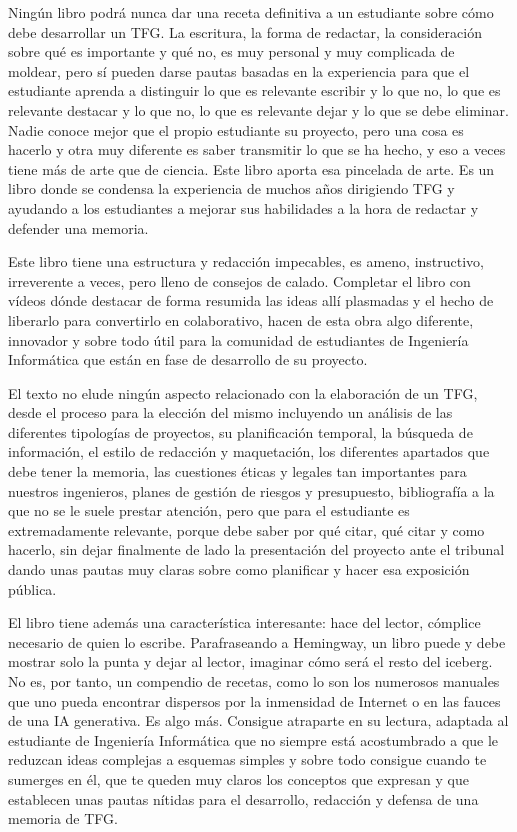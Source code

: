 Ningún libro podrá nunca dar una receta definitiva a un estudiante sobre cómo debe desarrollar un TFG. La escritura, la forma de redactar, la consideración sobre qué es importante y qué no, es muy personal y muy complicada de moldear, pero sí pueden darse pautas basadas en la experiencia para que el estudiante aprenda a distinguir lo que es relevante escribir y lo que no, lo que es relevante destacar y lo que no, lo que es relevante dejar y lo que se debe eliminar. Nadie conoce mejor que el propio estudiante su proyecto, pero una cosa es hacerlo y otra muy diferente es saber transmitir lo que se ha hecho, y eso a veces tiene más de arte que de ciencia.  Este libro aporta esa pincelada de arte. Es un libro donde se condensa la experiencia de muchos años dirigiendo TFG y ayudando a los estudiantes a mejorar sus habilidades a la hora de redactar  y defender una memoria.

Este libro tiene una estructura y redacción impecables, es ameno, instructivo, irreverente a veces, pero lleno de consejos de calado. Completar el libro con vídeos dónde destacar de forma resumida las ideas allí plasmadas y el hecho de liberarlo para convertirlo en colaborativo, hacen de esta obra algo diferente, innovador y sobre todo útil para la comunidad de estudiantes de Ingeniería Informática que están en fase de desarrollo de su proyecto.  

El texto no elude ningún aspecto relacionado con la elaboración de un TFG, desde el proceso para la elección del mismo incluyendo un análisis de las diferentes tipologías de proyectos, su planificación temporal, la búsqueda de información, el estilo de redacción y maquetación, los diferentes apartados que debe tener la memoria, las cuestiones éticas y legales tan importantes para nuestros ingenieros, planes de gestión de riesgos y presupuesto, bibliografía a la que no se le suele prestar atención, pero que para el estudiante es extremadamente relevante, porque debe saber por qué citar, qué citar y como hacerlo, sin dejar finalmente de lado la presentación del proyecto ante el tribunal dando unas pautas muy claras sobre como planificar y hacer esa exposición pública.

El libro tiene además una característica interesante: hace del lector, cómplice necesario de quien lo escribe. Parafraseando a Hemingway, un libro puede y debe mostrar solo la punta y dejar al lector, imaginar cómo será el resto del iceberg. No es, por tanto, un compendio de recetas, como lo son los numerosos manuales que uno pueda encontrar dispersos por la inmensidad de Internet o en las fauces de una IA generativa. Es algo más. Consigue atraparte en su lectura, adaptada al estudiante de Ingeniería Informática que no siempre está acostumbrado a que le reduzcan ideas complejas a esquemas simples y sobre todo consigue cuando te sumerges en él, que te queden muy claros los conceptos que expresan y que establecen unas pautas nítidas para el desarrollo, redacción y defensa de una memoria de TFG.

